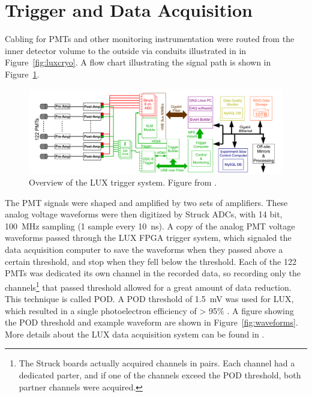 \section{Trigger and Data Acquisition}
Cabling for \ac{PMT}s and other monitoring instrumentation were routed from the inner detector volume to the outside via conduits illustrated in in Figure~\ref{fig:luxcryo}. A flow chart illustrating the signal path is shown in Figure~\ref{fig:luxdaq}. 

\begin{figure}[htbp]
\begin{center}
\includegraphics[width=\textwidth]{figures/lux/lux_daq.png}
\caption{Overview of the \acs{LUX} trigger system. Figure from \cite{LUXTrigger}. }
\label{fig:luxdaq}
\end{center}
\end{figure}


The \ac{PMT} signals were shaped and amplified by two sets of amplifiers. These analog voltage waveforms were then digitized by Struck \ac{ADC}s, with 14 bit, 100~MHz sampling (1 sample every 10~ns). A copy of the analog \ac{PMT} voltage waveforms passed through the \ac{LUX} \ac{FPGA} trigger system, which signaled the data acquisition computer to save the waveforms when they passed above a certain threshold, and stop when they fell below the threshold. Each of the 122 \ac{PMT}s was dedicated its own channel in the recorded data, so recording only the channels\footnote{The Struck boards actually acquired channels in pairs. Each channel had a dedicated parter, and if one of the channels exceed the \acs{POD} threshold, both partner channels were acquired.} that passed threshold allowed for a great amount of data reduction. This technique is called \ac{POD}. A \ac{POD} threshold of 1.5~mV was used for \ac{LUX}, which resulted in a single photoelectron efficiency of > 95\% \cite{LUX:Run03Comprehensive}. A figure showing the \ac{POD} threshold and example waveform are shown in Figure~\ref{fig:waveforms}. More details about the \ac{LUX} data acquisition system can be found in \cite{LUXDAQ}. 


